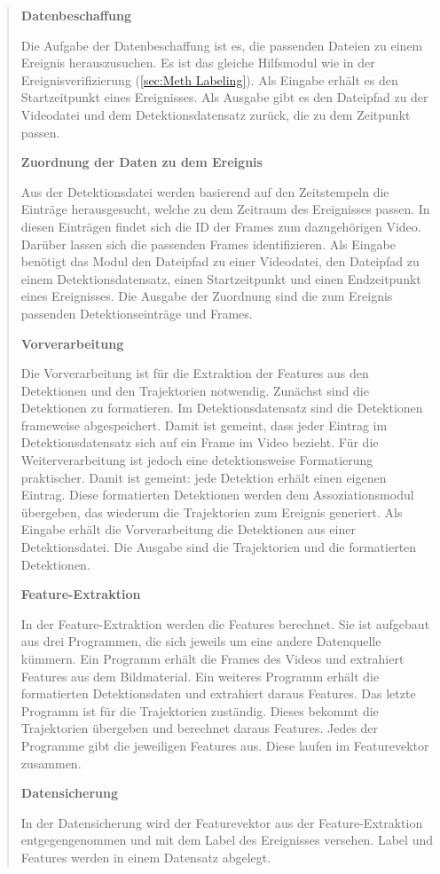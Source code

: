 \begin{quote}
\par
\textbf{Datenbeschaffung}\par
Die Aufgabe der Datenbeschaffung ist es, die passenden Dateien zu einem Ereignis herauszusuchen. Es ist das gleiche Hilfsmodul wie in der Ereignisverifizierung (\autoref{sec:Meth Labeling}). Als Eingabe erhält es den Startzeitpunkt eines Ereignisses. Als Ausgabe gibt es den Dateipfad zu der Videodatei und dem Detektionsdatensatz zurück, die zu dem Zeitpunkt passen. \dubpar

\textbf{Zuordnung der Daten zu dem Ereignis}\par
Aus der Detektionsdatei werden basierend auf den Zeitstempeln die Einträge herausgesucht, welche zu dem Zeitraum des Ereignisses passen. In diesen Einträgen findet sich die ID der Frames zum dazugehörigen Video. Darüber lassen sich die passenden Frames identifizieren. Als Eingabe benötigt das Modul den Dateipfad zu einer Videodatei, den Dateipfad zu einem Detektionsdatensatz, einen Startzeitpunkt und einen Endzeitpunkt eines Ereignisses. Die Ausgabe der Zuordnung sind die zum Ereignis passenden Detektionseinträge und Frames. \dubpar

\textbf{Vorverarbeitung}\par
Die Vorverarbeitung ist für die Extraktion der Features aus den Detektionen und den Trajektorien notwendig. Zunächst sind die Detektionen zu formatieren. Im Detektionsdatensatz sind die Detektionen frameweise abgespeichert. Damit ist gemeint, dass jeder Eintrag im Detektionsdatensatz sich auf ein Frame im Video bezieht. Für die Weiterverarbeitung ist jedoch eine detektionsweise Formatierung praktischer. Damit ist gemeint: jede Detektion erhält einen eigenen Eintrag. Diese formatierten Detektionen werden dem Assoziationsmodul übergeben, das wiederum die Trajektorien zum Ereignis generiert. Als Eingabe erhält die Vorverarbeitung die Detektionen aus einer Detektionsdatei. Die Ausgabe sind die Trajektorien und die formatierten Detektionen. \dubpar

\textbf{Feature-Extraktion}\par
In der Feature-Extraktion werden die Features berechnet. Sie ist aufgebaut aus drei Programmen, die sich jeweils um eine andere Datenquelle kümmern. Ein Programm erhält die Frames des Videos und extrahiert Features aus dem Bildmaterial. Ein weiteres Programm erhält die formatierten Detektionsdaten und extrahiert daraus Features. Das letzte Programm ist für die Trajektorien zuständig. Dieses bekommt die Trajektorien übergeben und berechnet daraus Features. Jedes der Programme gibt die jeweiligen Features aus. Diese laufen im Featurevektor zusammen. \dubpar

\textbf{Datensicherung}\par
In der Datensicherung wird der Featurevektor aus der Feature-Extraktion entgegengenommen und mit dem Label des Ereignisses versehen. Label und Features werden in einem Datensatz abgelegt. 

\end{quote}

